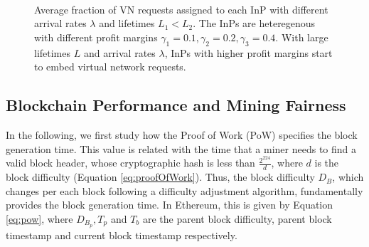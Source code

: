 \begin{figure}[t]
	\myfloatalign
	 \quad
	 \\
	\caption{Average fraction of VN requests assigned to each InP with different arrival rates $\lambda$ and lifetimes $L_1 < L_2$. The InPs are heteregenous with different profit margins $\gamma_1 = 0.1, \gamma_2 = 0.2, \gamma_3 = 0.4$. With large lifetimes $L$ and arrival rates $\lambda$, InPs with higher profit margins start to embed virtual network requests.}
	\label{fig:winners}
\end{figure}


\subsection{Blockchain Performance and Mining Fairness} \label{resultsBlock}

In the following, we first study how the Proof of Work (PoW) specifies the block generation time. This value is related with the time that a miner needs to find a valid block header, whose cryptographic hash is less than $\frac{2^{224}}{d}$, where $d$ is the block difficulty (Equation \ref{eq:proofOfWork}). Thus, the block difficulty $D_B$, which changes per each block following a difficulty adjustment algorithm, fundamentally provides the block generation time. In Ethereum, this is given by Equation \ref{eq:pow}, where $D_{B_p}, T_p$ and $T_b$ are the parent block difficulty, parent block timestamp and current block timestamp respectively.

